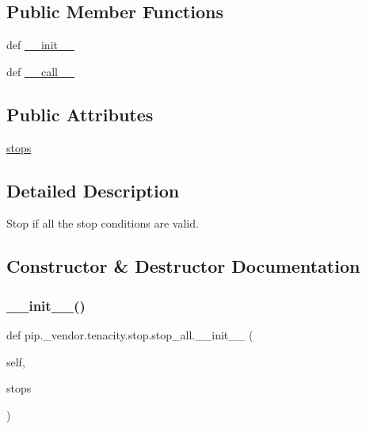 \subsection*{Public Member Functions}
\begin{DoxyCompactItemize}
\item 
def \hyperlink{classpip_1_1__vendor_1_1tenacity_1_1stop_1_1stop__all_a5d135769fbe02c1c856cb1d7b9add3b0}{\+\_\+\+\_\+init\+\_\+\+\_\+}
\item 
def \hyperlink{classpip_1_1__vendor_1_1tenacity_1_1stop_1_1stop__all_a9d4c7e6d9a74781965d80001733818df}{\+\_\+\+\_\+call\+\_\+\+\_\+}
\end{DoxyCompactItemize}
\subsection*{Public Attributes}
\begin{DoxyCompactItemize}
\item 
\hyperlink{classpip_1_1__vendor_1_1tenacity_1_1stop_1_1stop__all_ab7f7a96f6d7dccb22e23cc0018b02581}{stops}
\end{DoxyCompactItemize}


\subsection{Detailed Description}
\begin{DoxyVerb}Stop if all the stop conditions are valid.\end{DoxyVerb}
 

\subsection{Constructor \& Destructor Documentation}
\mbox{\label{classpip_1_1__vendor_1_1tenacity_1_1stop_1_1stop__all_a5d135769fbe02c1c856cb1d7b9add3b0}} 
\subsubsection{\texorpdfstring{\+\_\+\+\_\+init\+\_\+\+\_\+()}{\_\_init\_\_()}}
{\footnotesize\ttfamily def pip.\+\_\+vendor.\+tenacity.\+stop.\+stop\+\_\+all.\+\_\+\+\_\+init\+\_\+\+\_\+ (\begin{DoxyParamCaption}\item[{}]{self,  }\item[{}]{stops }\end{DoxyParamCaption})}



